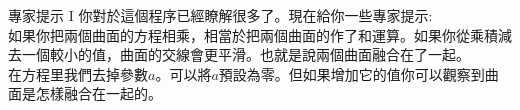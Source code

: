 \begin{surferPage}{專家提示 I}
你對於這個程序已經瞭解很多了。現在給你一些專家提示:\\
\vspace{0.3cm}
如果你把兩個曲面的方程相乘，相當於把兩個曲面的作了和運算。如果你從乘積減去一個較小的值，曲面的交線會更平滑。也就是說兩個曲面融合在了一起。\\
\vspace{0.3cm}
在方程里我們去掉參數$a$。可以將$a$預設為零。但如果增加它的值你可以觀察到曲面是怎樣融合在一起的。
\end{surferPage}
